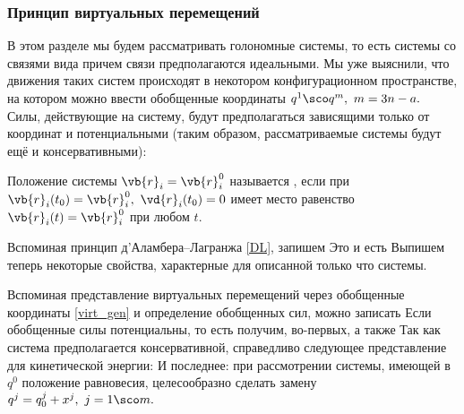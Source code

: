 \subsubsection{Принцип виртуальных перемещений}

В этом разделе мы будем рассматривать голономные
системы, то есть системы со связями вида
 причем
связи предполагаются идеальными. Мы уже выяснили, что движения таких
систем происходят в некотором конфигурационном пространстве, на
котором можно ввести обобщенные координаты $q^1\sco q^m,\ m=3n-a.$
Силы, действующие на систему, будут предполагаться зависящими только
от координат и потенциальными (таким образом, рассматриваемые системы будут ещё и консервативными): 
\begin{df}
Положение системы $\vb{r}_i=\vb{r}^0_i$ называется , если при $\vb{r}_i(t_0)=\vb{r}_i^0,\ \vd{r}_i(t_0)=0$
имеет место равенство $\vb{r}_i(t)=\vb{r}_i^0$ при любом $t$.
\end{df}
Вспоминая принцип д'Аламбера--Лагранжа \eqref{DL}, запишем
 Это
и есть  Выпишем теперь
некоторые свойства, характерные для описанной только что системы.

Вспоминая представление виртуальных перемещений через обобщенные
координаты \eqref{virt_gen} и определение обобщенных сил, можно
записать  Если обобщенные силы
потенциальны, то есть  получим,
во-первых,  а также
Так как система предполагается консервативной,
справедливо следующее представление для кинетической энергии:
И последнее: при рассмотрении системы, имеющей в $q^0$ положение
равновесия, целесообразно сделать замену $q^j=q^j_0+x^j,\ j=1\sco
m.$


